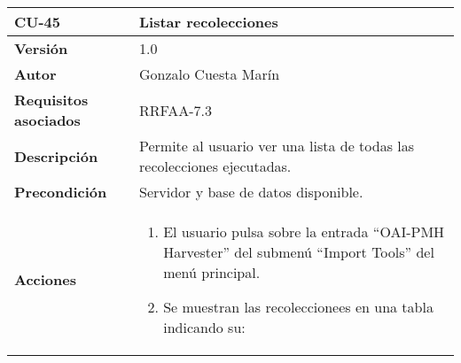 \begin{longtable}[]{@{}ll@{}}
\toprule
\begin{minipage}[b]{0.19\columnwidth}\raggedright
\textbf{CU-45}\strut
\end{minipage} & \begin{minipage}[b]{0.76\columnwidth}\raggedright
\textbf{Listar recolecciones}\strut
\end{minipage}\tabularnewline
\midrule
\endhead
\begin{minipage}[t]{0.19\columnwidth}\raggedright
\textbf{Versión}\strut
\end{minipage} & \begin{minipage}[t]{0.76\columnwidth}\raggedright
1.0\strut
\end{minipage}\tabularnewline
\begin{minipage}[t]{0.19\columnwidth}\raggedright
\textbf{Autor}\strut
\end{minipage} & \begin{minipage}[t]{0.76\columnwidth}\raggedright
Gonzalo Cuesta Marín\strut
\end{minipage}\tabularnewline
\begin{minipage}[t]{0.19\columnwidth}\raggedright
\textbf{Requisitos asociados}\strut
\end{minipage} & \begin{minipage}[t]{0.76\columnwidth}\raggedright
RRFAA-7.3\strut
\end{minipage}\tabularnewline
\begin{minipage}[t]{0.19\columnwidth}\raggedright
\textbf{Descripción}\strut
\end{minipage} & \begin{minipage}[t]{0.76\columnwidth}\raggedright
Permite al usuario ver una lista de todas las recolecciones
ejecutadas.\strut
\end{minipage}\tabularnewline
\begin{minipage}[t]{0.19\columnwidth}\raggedright
\textbf{Precondición}\strut
\end{minipage} & \begin{minipage}[t]{0.76\columnwidth}\raggedright
Servidor y base de datos disponible.\strut
\end{minipage}\tabularnewline
\begin{minipage}[t]{0.19\columnwidth}\raggedright
\textbf{Acciones}\strut
\end{minipage} & \begin{minipage}[t]{0.76\columnwidth}\raggedright
\begin{enumerate}
\def\labelenumi{\arabic{enumi}.}
\tightlist
\item
  El usuario pulsa sobre la entrada ``OAI-PMH Harvester'' del submenú
  ``Import Tools'' del menú principal.
\item
  Se muestran las recoleccionees en una tabla indicando su:


\end{enumerate}
\end{minipage}
\end{longtable}
